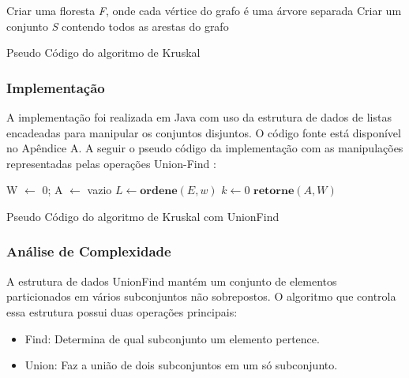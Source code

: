 \documentclass[a4paper,12pt]{article}
\begin{document}
\begin{algorithm}[H]
\SetAlgoLined
{}
Criar uma floresta \emph{F}, onde cada vértice do grafo é uma árvore separada\;
Criar um conjunto \emph{S} contendo todos as arestas do grafo\;
\caption{Pseudo Código do algoritmo de Kruskal}
\end{algorithm}

\subsubsection{Implementação}
A implementação foi realizada em Java com uso da estrutura de dados de listas encadeadas para manipular os conjuntos disjuntos. O código fonte está disponível no Apêndice A. A seguir o pseudo código da implementação com as manipulações representadas pelas operações Union-Find :\\
\begin{algorithm}[H]
\LinesNumbered
\SetAlgoLined
{}
W $\gets$ 0; A $\gets$ vazio\;
$L \gets \textbf{ordene}(E ,w )$\;
$k \gets 0$\;
$\textbf{retorne} (A, W)$\;
\caption{Pseudo Código do algoritmo de Kruskal com UnionFind}
\label{kruskal}
\end{algorithm}

\subsubsection{Análise de Complexidade}
A estrutura de dados UnionFind mantém um conjunto de elementos particionados em vários subconjuntos não sobrepostos. O algoritmo que controla essa estrutura possui duas operações principais:
\begin{itemize}
\item Find: Determina de qual subconjunto um elemento pertence.
\item Union: Faz a união de dois subconjuntos em um só subconjunto.
\end{itemize}
\end{document}
